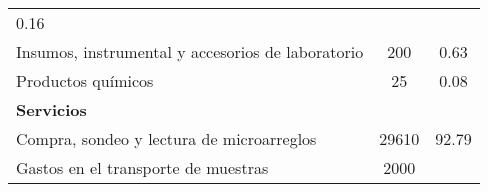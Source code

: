 \documentclass[]{article}
\begin{document}
\begin{longtable}[]{@{}lcc@{}}
\begin{minipage}[t]{0.22\columnwidth}
0.16\strut
\end{minipage}\tabularnewline
\begin{minipage}[t]{0.46\columnwidth}\raggedright\strut
Insumos, instrumental y accesorios de laboratorio\strut
\end{minipage} & \begin{minipage}[t]{0.22\columnwidth}\centering\strut
200\strut
\end{minipage} & \begin{minipage}[t]{0.22\columnwidth}\centering\strut
0.63\strut
\end{minipage}\tabularnewline
\begin{minipage}[t]{0.46\columnwidth}\raggedright\strut
Productos químicos\strut
\end{minipage} & \begin{minipage}[t]{0.22\columnwidth}\centering\strut
25\strut
\end{minipage} & \begin{minipage}[t]{0.22\columnwidth}\centering\strut
0.08\strut
\end{minipage}\tabularnewline
\begin{minipage}[t]{0.46\columnwidth}\raggedright\strut
\textbf{Servicios}\strut
\end{minipage} & \begin{minipage}[t]{0.22\columnwidth}\centering\strut
\strut
\end{minipage} & \begin{minipage}[t]{0.22\columnwidth}\centering\strut
\strut
\end{minipage}\tabularnewline
\begin{minipage}[t]{0.46\columnwidth}\raggedright\strut
Compra, sondeo y lectura de microarreglos\strut
\end{minipage} & \begin{minipage}[t]{0.22\columnwidth}\centering\strut
29610\strut
\end{minipage} & \begin{minipage}[t]{0.22\columnwidth}\centering\strut
92.79\strut
\end{minipage}\tabularnewline
\begin{minipage}[t]{0.46\columnwidth}\raggedright\strut
Gastos en el transporte de muestras\strut
\end{minipage} & \begin{minipage}[t]{0.22\columnwidth}\centering\strut
2000\strut
\end{minipage} & \begin{minipage}[t]{0.22\columnwidth}\centering\strut

\end{minipage}
\end{longtable}
\end{document}
